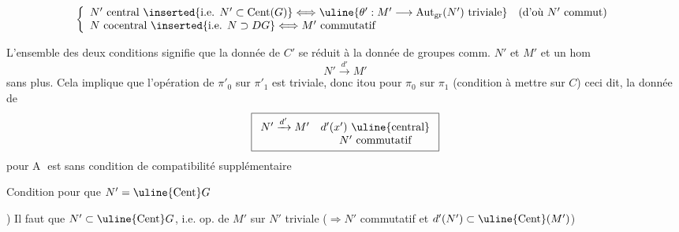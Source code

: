 \hrulefill

\[
\left\{\begin{array}{l}
N'\text{ central}\ \inserted{\text{i.e. }N'\subset\operatorname{Cent}(G)}
\Longleftrightarrow\uline{\theta':M'\longrightarrow\operatorname{Aut}_{\mathrm{gr}}(N')\text{ triviale}}\quad(\text{d'où }N'\text{ commut})\\
N\text{ cocentral}\ \inserted{\text{i.e. }N\supset DG}\Longleftrightarrow M'\text{ commutatif}
\end{array}\right.
\]

L'ensemble des deux conditions signifie que
la donnée de $C'$ se réduit à la donnée
de groupes comm. $N'$ et $M'$ et un
hom
\[
N'\xrightarrow{d'}M'
\]
sans plus. Cela implique que l'opération
de $\pi'_0$ sur $\pi'_1$ est triviale, donc itou pour
$\pi_0$ sur $\pi_1$ (condition à mettre sur $C$)
ceci dit, la donnée de
\[
\boxed{\begin{array}{cc}N'\xrightarrow{d'}M'&d'(x')\text{ \uline{central}}\\&N'\text{ commutatif}\end{array}}
\]
pour \textcircled{A} est sans condition
de compatibilité supplémentaire


Condition pour que $N'=\uline{\operatorname{Cent}}G$

) Il faut que $N'\subset\uline{\operatorname{Cent}}G$, i.e. op.  de $M'$ sur $N'$
triviale ($\Longrightarrow N'$ commutatif et $d'(N')\subset\uline{\operatorname{Cent}}(M')$)

